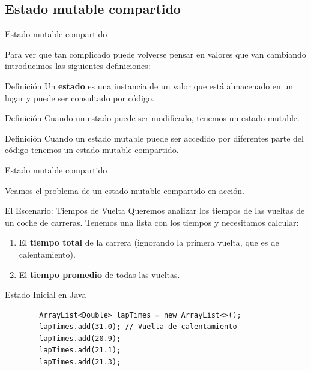 \documentclass{beamer}
\begin{document}
\subsection{Estado mutable compartido}

\begin{frame}{Estado mutable compartido}

    Para ver que tan complicado puede volverse pensar en valores que van cambiando introducimos las siguientes definiciones:

    \begin{block}{Definición}
        Un \textbf{estado} es una instancia de un valor que está almacenado en un lugar y puede ser consultado por código.
    \end{block}
    
    \begin{block}{Definición}
        Cuando un estado puede ser modificado, tenemos un estado mutable.
    \end{block}
    
    \begin{block}{Definición}
        Cuando un estado mutable puede ser accedido por diferentes parte del código tenemos un estado mutable compartido.
    \end{block}


\end{frame}

\begin{frame}{Estado mutable compartido}

    Veamos el problema de un estado mutable compartido en acción.
    
\end{frame}

\begin{frame}[fragile]{El Escenario: Tiempos de Vuelta}
    Queremos analizar los tiempos de las vueltas de un coche de carreras. Tenemos una lista con los tiempos y necesitamos calcular:
    \begin{enumerate}
        \item El \textbf{tiempo total} de la carrera (ignorando la primera vuelta, que es de calentamiento).
        \item El \textbf{tiempo promedio} de todas las vueltas.
    \end{enumerate}

    \vspace{0.3cm}
    \begin{exampleblock}{Estado Inicial en Java}
        \begin{lstlisting}
        ArrayList<Double> lapTimes = new ArrayList<>();
        lapTimes.add(31.0); // Vuelta de calentamiento
        lapTimes.add(20.9);
        lapTimes.add(21.1);
        lapTimes.add(21.3);
        \end{lstlisting}
    \end{exampleblock}
\end{frame}
\end{document}
